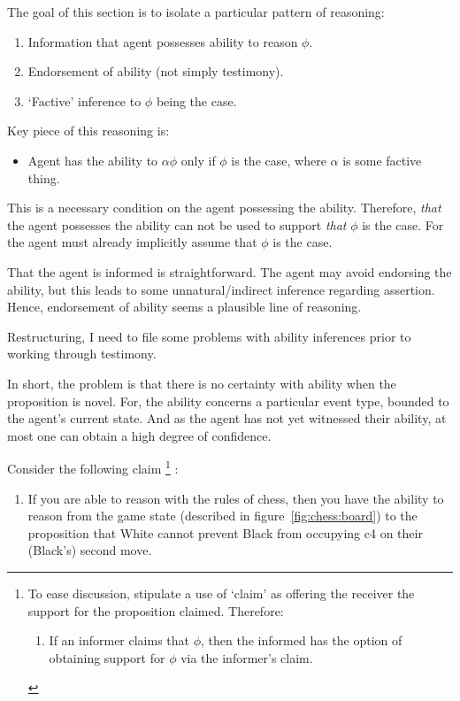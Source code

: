 \documentclass[10pt]{article}
\begin{document}
\begin{note}
  The goal of this section is to isolate a particular pattern of reasoning:
  \begin{enumerate}
  \item Information that agent possesses ability to reason \(\phi\).
  \item Endorsement of ability (not simply testimony).
  \item `Factive' inference to \(\phi\) being the case.
  \end{enumerate}
  Key piece of this reasoning is:
  \begin{itemize}
  \item Agent has the ability to \(\alpha\phi\) only if \(\phi\) is the case, where \(\alpha\) is some factive thing.
  \end{itemize}
  This is a necessary condition on the agent possessing the ability.
  Therefore, \emph{that} the agent possesses the ability can not be used to support \emph{that} \(\phi\) is the case.
  For the agent must already implicitly assume that \(\phi\) is the case.

  That the agent is informed is straightforward.
  The agent may avoid endorsing the ability, but this leads to some unnatural/indirect inference regarding assertion.
  Hence, endorsement of ability seems a plausible line of reasoning.

  Restructuring, I need to file some problems with ability inferences prior to working through testimony.

  In short, the problem is that there is no certainty with ability when the proposition is novel.
  For, the ability concerns a particular event type, bounded to the agent's current state.
  And as the agent has not yet witnessed their ability, at most one can obtain a high degree of confidence.
\end{note}

Consider the following claim\nolinebreak
\footnote{
  To ease discussion, stipulate a use of `claim' as offering the receiver the support for the proposition claimed.
  Therefore:
  \begin{enumerate}
  \item\label{cond:claim-to-opt-supp} If an informer claims that \(\phi\), then the informed has the option of obtaining support for \(\phi\) via the informer's claim.
  \end{enumerate}\vspace{-10pt}
}\nolinebreak
:
\begin{enumerate}
\item\label{chess:claim:1}\label{chess:claim:1:conditional} If you are able to reason with the rules of chess, then you have the ability to reason from the game state (described in figure~\ref{fig:chess:board}) to the proposition that White cannot prevent Black from occupying c4 on their (Black's) second move.
\end{enumerate}
\end{document}
